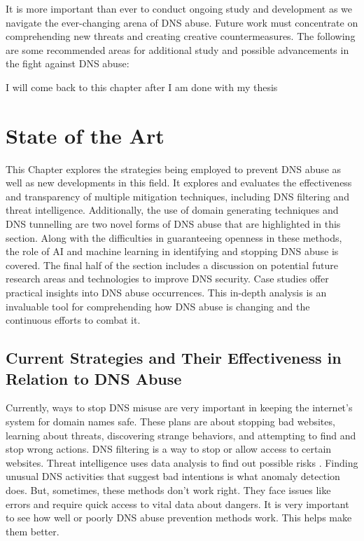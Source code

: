 It is more important than ever to conduct ongoing study and development as we navigate the ever-changing arena of DNS abuse. Future work must concentrate on comprehending new threats and creating creative countermeasures. The following are some recommended areas for additional study and possible advancements in the fight against DNS abuse:

I will come back to this chapter after I am done with my thesis 

\chapter{State of the Art}

This Chapter explores the strategies being employed to prevent DNS abuse as well as new developments in this field. It explores and evaluates the effectiveness and transparency of multiple mitigation techniques, including DNS filtering and threat intelligence. Additionally, the use of domain generating techniques and DNS tunnelling are two novel forms of DNS abuse that are highlighted in this section. Along with the difficulties in guaranteeing openness in these methods, the role of AI and machine learning in identifying and stopping DNS abuse is covered. The final half of the section includes a discussion on potential future research areas and technologies to improve DNS security. Case studies offer practical insights into DNS abuse occurrences. This in-depth analysis is an invaluable tool for comprehending how DNS abuse is changing and the continuous efforts to combat it.


\section{Current Strategies and Their Effectiveness in Relation to DNS Abuse}

Currently, ways to stop DNS misuse are very important in keeping the internet's system for domain names safe. These plans are about stopping bad websites, learning about threats, discovering strange behaviors, and attempting to find and stop wrong actions. DNS filtering is a way to stop or allow access to certain websites. Threat intelligence uses data analysis to find out possible risks \cite{schmid2021thirty}. Finding unusual DNS activities that suggest bad intentions is what anomaly detection does. But, sometimes, these methods don't work right. They face issues like errors and require quick access to vital data about dangers. It is very important to see how well or poorly DNS abuse prevention methods work. This helps make them better.

